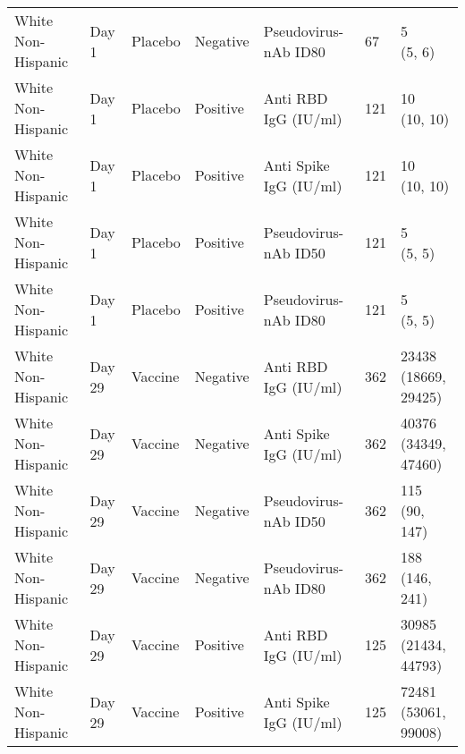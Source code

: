 \documentclass[]{book}
\theoremstyle{definition}
\theoremstyle{definition}
\theoremstyle{definition}
\newcommand{\1}{\mathbbm{1}}
\begin{document}
\begin{landscape}
\begin{ThreePartTable}
\begin{longtable}[t]{>{\raggedright\arraybackslash}p{7cm}llllll}
\hspace{1em}White Non-Hispanic & Day 1 & Placebo & Negative & Pseudovirus-nAb ID80 & 67 & \makecell[l]{5\\(5, 6)}\\
\hspace{1em}White Non-Hispanic & Day 1 & Placebo & Positive & Anti RBD IgG (IU/ml) & 121 & \makecell[l]{10\\(10, 10)}\\
\hspace{1em}White Non-Hispanic & Day 1 & Placebo & Positive & Anti Spike IgG (IU/ml) & 121 & \makecell[l]{10\\(10, 10)}\\
\hspace{1em}White Non-Hispanic & Day 1 & Placebo & Positive & Pseudovirus-nAb ID50 & 121 & \makecell[l]{5\\(5, 5)}\\
\hspace{1em}White Non-Hispanic & Day 1 & Placebo & Positive & Pseudovirus-nAb ID80 & 121 & \makecell[l]{5\\(5, 5)}\\
\hspace{1em}White Non-Hispanic & Day 29 & Vaccine & Negative & Anti RBD IgG (IU/ml) & 362 & \makecell[l]{23438\\(18669, 29425)}\\
\hspace{1em}White Non-Hispanic & Day 29 & Vaccine & Negative & Anti Spike IgG (IU/ml) & 362 & \makecell[l]{40376\\(34349, 47460)}\\
\hspace{1em}White Non-Hispanic & Day 29 & Vaccine & Negative & Pseudovirus-nAb ID50 & 362 & \makecell[l]{115\\(90, 147)}\\
\hspace{1em}White Non-Hispanic & Day 29 & Vaccine & Negative & Pseudovirus-nAb ID80 & 362 & \makecell[l]{188\\(146, 241)}\\
\hspace{1em}White Non-Hispanic & Day 29 & Vaccine & Positive & Anti RBD IgG (IU/ml) & 125 & \makecell[l]{30985\\(21434, 44793)}\\
\hspace{1em}White Non-Hispanic & Day 29 & Vaccine & Positive & Anti Spike IgG (IU/ml) & 125 & \makecell[l]{72481\\(53061, 99008)}\\

\end{longtable}
\end{ThreePartTable}
\end{landscape}
\end{document}

